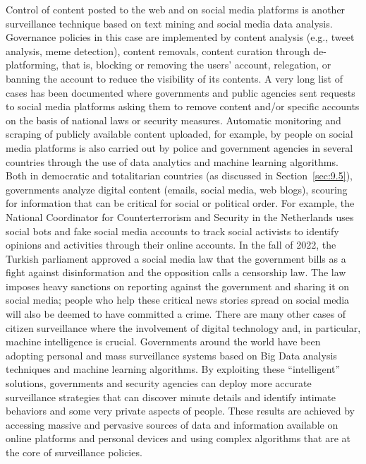 Control of content posted to the web and on social media platforms is another surveillance technique based on text mining and social media data analysis. Governance policies in this case are implemented by content analysis (e.g., tweet analysis, meme detection), content removals, content curation through de-platforming, that is, blocking or removing the users' account, relegation, or banning the account to reduce the visibility of its contents. A very long list of cases has been documented where governments and public agencies sent requests to social media platforms asking them to remove content and/or specific accounts on the basis of national laws or security measures. Automatic monitoring and scraping of publicly available content uploaded, for example, by people on social media platforms is also carried out by police and government agencies in several countries through the use of data analytics and machine learning algorithms. Both in democratic and totalitarian countries (as discussed in Section~\ref{sec:9.5}), governments analyze digital content (emails, social media, web blogs), scouring for information that can be critical for social or political order. For example, the National Coordinator for Counterterrorism and Security in the Netherlands uses social bots and fake social media accounts to track social activists to identify opinions and activities through their online accounts. In the fall of 2022, the Turkish parliament approved a social media law that the government bills as a fight against disinformation and the opposition calls a censorship law. The law imposes heavy sanctions on reporting against the government and sharing it on social media; people who help these critical news stories spread on social media will also be deemed to have committed a crime. There are many other cases of citizen surveillance where the involvement of digital technology and, in particular, machine intelligence is crucial. Governments around the world have been adopting personal and mass surveillance systems based on Big Data analysis techniques and machine learning algorithms. By exploiting these ``intelligent'' solutions, governments and security agencies can deploy more accurate surveillance strategies that can discover minute details and identify intimate behaviors and some very private aspects of people. These results are achieved by accessing massive and pervasive sources of data and information available on online platforms and personal devices and using complex algorithms that are at the core of surveillance policies.

